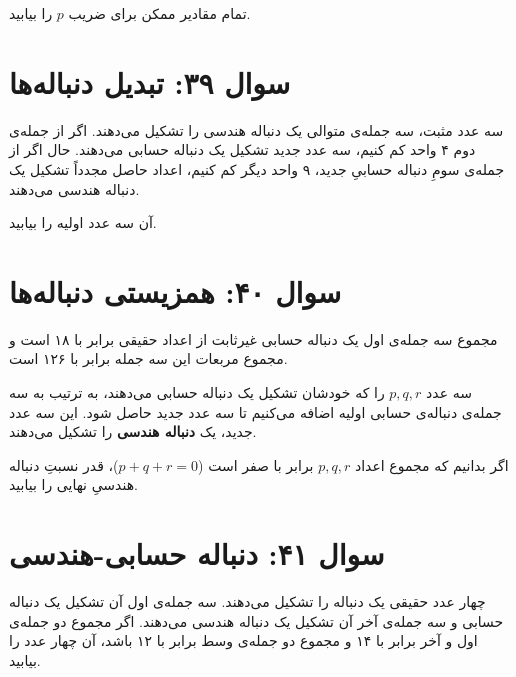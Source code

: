 \documentclass[12pt]{article}
\begin{document}
	تمام مقادیر ممکن برای ضریب \(p\) را بیابید.
	
	\vspace{1cm}
	\hrulefill
	\vspace{1cm}
	
	\section*{سوال ۳۹: تبدیل دنباله‌ها}
	سه عدد مثبت، سه جمله‌ی متوالی یک دنباله هندسی را تشکیل می‌دهند. اگر از جمله‌ی دوم ۴ واحد کم کنیم، سه عدد جدید تشکیل یک دنباله حسابی می‌دهند. حال اگر از جمله‌ی سومِ دنباله حسابیِ جدید، ۹ واحد دیگر کم کنیم، اعداد حاصل مجدداً تشکیل یک دنباله هندسی می‌دهند.
	\vspace{0.5cm}
	
	آن سه عدد اولیه را بیابید.
	
	\vspace{1cm}
	\hrulefill
	\vspace{1cm}
	
	\section*{سوال ۴۰: همزیستی دنباله‌ها }
	مجموع سه جمله‌ی اول یک دنباله حسابی غیرثابت از اعداد حقیقی برابر با ۱۸ است و مجموع مربعات این سه جمله برابر با ۱۲۶ است.
	\vspace{0.5cm}
	
	سه عدد \(p, q, r\) را که خودشان تشکیل یک دنباله حسابی می‌دهند، به ترتیب به سه جمله‌ی دنباله‌ی حسابی اولیه اضافه می‌کنیم تا سه عدد جدید حاصل شود. این سه عدد جدید، یک \textbf{دنباله هندسی} را تشکیل می‌دهند.
	\vspace{0.5cm}
	
	اگر بدانیم که مجموع اعداد \(p, q, r\) برابر با صفر است (\(p+q+r=0\))، قدر نسبتِ دنباله هندسیِ نهایی را بیابید.
	
	\vspace{1cm}
	\hrulefill
	\vspace{1cm}
	
	\section*{سوال ۴۱: دنباله حسابی-هندسی}
	چهار عدد حقیقی یک دنباله را تشکیل می‌دهند. سه جمله‌ی اول آن تشکیل یک دنباله حسابی و سه جمله‌ی آخر آن تشکیل یک دنباله هندسی می‌دهند. اگر مجموع دو جمله‌ی اول و آخر برابر با ۱۴ و مجموع دو جمله‌ی وسط برابر با ۱۲ باشد، آن چهار عدد را بیابید.
	
\end{document}
